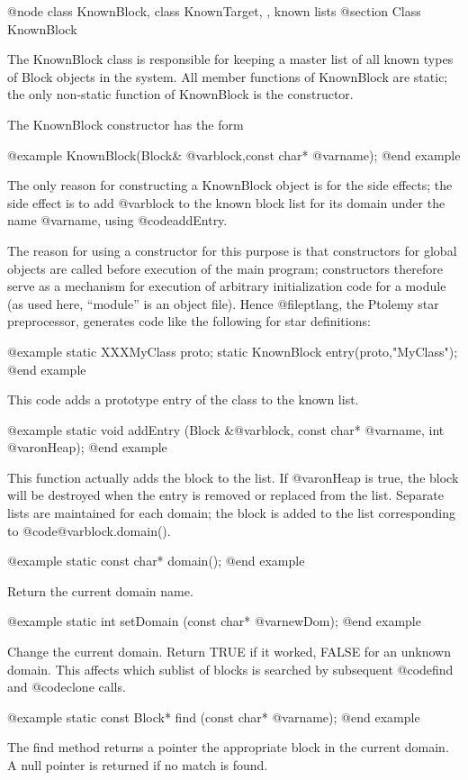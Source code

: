 @node class KnownBlock, class KnownTarget,  , known lists
@section Class KnownBlock

The KnownBlock class is responsible for keeping a master list of all
known types of Block objects in the system.  All member functions of
KnownBlock are static; the only non-static function of KnownBlock is
the constructor.

The KnownBlock constructor has the form

@example
KnownBlock(Block& @var{block},const char* @var{name});
@end example

The only reason for constructing a KnownBlock object is for the side
effects; the side effect is to add @var{block} to the known block list
for its domain under the name @var{name}, using @code{addEntry}.

The reason for using a constructor for this purpose is that constructors
for global objects are called before execution of the main program;
constructors therefore serve as a mechanism for execution of arbitrary
initialization code for a module (as used here, ``module'' is an object
file).  Hence @file{ptlang}, the Ptolemy star preprocessor, generates
code like the following for star definitions:

@example
static XXXMyClass proto;
static KnownBlock entry(proto,"MyClass");
@end example

This code adds a prototype entry of the class to the known list.

@example
static void addEntry (Block &@var{block}, const char* @var{name}, int @var{onHeap});
@end example

This function actually adds the block to the list.  If @var{onHeap} is true,
the block will be destroyed when the entry is removed or replaced from
the list.  Separate lists are maintained for each domain; the block
is added to the list corresponding to @code{@var{block}.domain()}.

@example
static const char* domain();
@end example

Return the current domain name.

@example
static int setDomain (const char* @var{newDom});
@end example

Change the current domain.  Return TRUE if it worked, FALSE for an
unknown domain.  This affects which sublist of blocks is searched by
subsequent @code{find} and @code{clone} calls.

@example
static const Block* find (const char* @var{name});
@end example

The find method returns a pointer the appropriate block in
the current domain.  A null pointer is returned if no match
is found.


